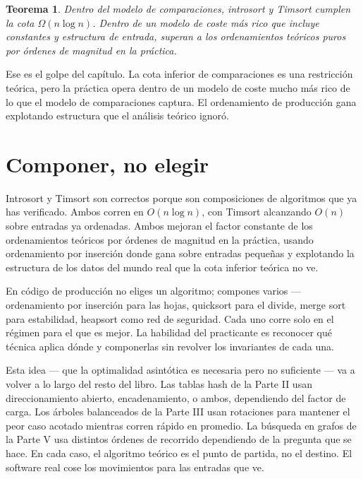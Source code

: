 \documentclass[11pt,a4paper]{article}
\newtheorem{teorema}{Teorema}
\begin{document}
\begin{teorema}
Dentro del modelo de comparaciones, introsort y Timsort cumplen la cota $\Omega(n \log n)$. Dentro de un modelo de coste más rico que incluye constantes y estructura de entrada, superan a los ordenamientos teóricos puros por órdenes de magnitud en la práctica.
\end{teorema}

Ese es el golpe del capítulo. La cota inferior de comparaciones es una restricción teórica, pero la práctica opera dentro de un modelo de coste mucho más rico de lo que el modelo de comparaciones captura. El ordenamiento de producción gana explotando estructura que el análisis teórico ignoró.

\section{Componer, no elegir}

Introsort y Timsort son correctos porque son composiciones de algoritmos que ya has verificado. Ambos corren en $O(n \log n)$, con Timsort alcanzando $O(n)$ sobre entradas ya ordenadas. Ambos mejoran el factor constante de los ordenamientos teóricos por órdenes de magnitud en la práctica, usando ordenamiento por inserción donde gana sobre entradas pequeñas y explotando la estructura de los datos del mundo real que la cota inferior teórica no ve.

En código de producción no eliges un algoritmo; compones varios --- ordenamiento por inserción para las hojas, quicksort para el divide, merge sort para estabilidad, heapsort como red de seguridad. Cada uno corre solo en el régimen para el que es mejor. La habilidad del practicante es reconocer qué técnica aplica dónde y componerlas sin revolver los invariantes de cada una.

Esta idea --- que la optimalidad asintótica es necesaria pero no suficiente --- va a volver a lo largo del resto del libro. Las tablas hash de la Parte II usan direccionamiento abierto, encadenamiento, o ambos, dependiendo del factor de carga. Los árboles balanceados de la Parte III usan rotaciones para mantener el peor caso acotado mientras corren rápido en promedio. La búsqueda en grafos de la Parte V usa distintos órdenes de recorrido dependiendo de la pregunta que se hace. En cada caso, el algoritmo teórico es el punto de partida, no el destino. El software real cose los movimientos para las entradas que ve.
\end{document}

